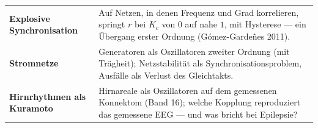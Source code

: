 \begin{forschung}
\begin{center}
{\small
\renewcommand{\arraystretch}{1.45}
\begin{tabular}{@{}P{3.0cm}P{5.2cm}@{}}
\toprule
\textbf{Explosive Synchronisation} & Auf Netzen, in denen Frequenz und Grad korrelieren, springt $r$ bei $K_c$ von $0$ auf nahe $1$, mit Hysterese --- ein Übergang erster Ordnung (Gómez-Gardeñes 2011).\\
\textbf{Stromnetze} & Generatoren als Oszillatoren zweiter Ordnung (mit Trägheit); Netzstabilität als Synchronisationsproblem, Ausfälle als Verlust des Gleichtakts.\\
\textbf{Hirnrhythmen als Kuramoto} & Hirnareale als Oszillatoren auf dem gemessenen Konnektom (Band 16); welche Kopplung reproduziert das gemessene EEG --- und was bricht bei Epilepsie?\\
\bottomrule
\end{tabular}}
\end{center}

\begin{center}
\begin{minipage}{0.88\textwidth}
\end{minipage}
\end{center}
\end{forschung}

